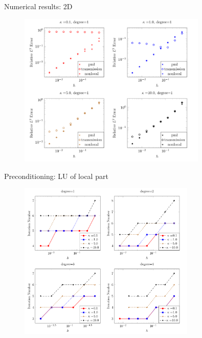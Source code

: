 \documentclass{beamer}
\begin{document}
\begin{frame}{Numerical results: 2D}
    \begin{figure}[ht]
    \begin{center}
        \includegraphics[width=0.8\textwidth]{images/degree-1-accuracy.png}
    \end{center}
    \end{figure}
\end{frame}

\begin{frame}{Preconditioning: LU of local part}
    \begin{figure}[ht]
    \begin{center}
        \includegraphics[width=0.75\textwidth]{images/iteration-pc-by-transmission.png}
    \end{center}
    \end{figure}
\end{frame}
\end{document}
